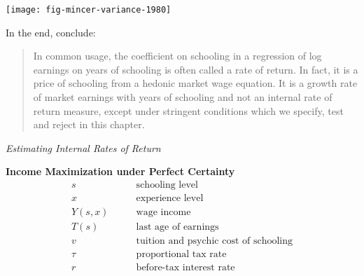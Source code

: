 \begin{frame}[plain]
\begin{center}
\texttt{[image: fig-mincer-variance-1980]}
\end{center}
\end{frame}


\begin{frame}
In the end, \citet{Heckman.2006a} conclude:\vspace{0.5cm}

\begin{quote}
In common usage, the coefficient on schooling in a regression of log earnings on years of schooling is often called a rate of return. In fact, it is a price of schooling from a hedonic market wage equation. It is a growth rate of market earnings with years of schooling and not an internal rate of return measure, except under stringent conditions which we specify, test and reject in this chapter.
\end{quote}
\end{frame}
\begin{frame}\begin{center}
\LARGE\textit{Estimating Internal Rates of Return}
\end{center}\end{frame}
\begin{frame}
\textbf{Income Maximization under Perfect Certainty \citep{Rosen.1977,Willis.1986}}
\begin{align*}
s               &\qquad\text{schooling level} \\
x               &\qquad\text{experience level} \\
Y(s, x)         &\qquad\text{wage income} \\
T(s)            &\qquad\text{last age of earnings} \\
v               &\qquad\text{tuition and psychic cost of schooling} \\
\tau            &\qquad\text{proportional tax rate} \\
r               &\qquad\text{before-tax interest rate}
\end{align*}
\end{frame}


